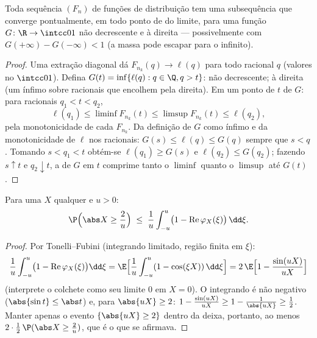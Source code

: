 \begin{theorem}
\label{thm:b3:clt:helly}
Toda sequência $(F_n)$ de funções de distribuição tem uma
subsequência que converge pontualmente, em todo ponto de  do
limite, para uma função $G \colon
\R \to \intcc01$ não decrescente e  à direita ---
possivelmente com $G(+\infty) - G(-\infty) <
1$ (a massa pode escapar para o infinito).
\end{theorem}

\begin{proof}
Uma extração diagonal dá $F_{n_k}(q) \to \ell(q)$ para todo racional $q$ (valores no
 $\intcc01$). Defina $G(t) = \inf\{\ell(q) : q \in \Q, q > t\}$: não decrescente;  à direita (um
ínfimo sobre  racionais que encolhem pela direita). Em um
ponto de  $t$ de $G$: para racionais $q_1 < t < q_2$,
\[
\ell(q_1) \leq \liminf F_{n_k}(t) \leq \limsup F_{n_k}(t)
\leq \ell(q_2),
\]
pela monotonicidade de cada $F_{n_k}$. Da definição de $G$ como ínfimo e
da monotonicidade de $\ell$ nos racionais: $G(s) \leq \ell(q) \leq G(q)$ sempre que $s < q$.
Tomando $s < q_1 < t$ obtém-se $\ell(q_1) \geq G(s)$ e $\ell(q_2) \leq G(q_2)$; fazendo $s \uparrow t$ e $q_2
\downarrow t$, a 
de $G$ em $t$ comprime tanto o $\liminf$ quanto o $\limsup$ até $G(t)$.
\end{proof}

\begin{lemma}
\label{lem:b3:clt:tightness}
Para uma  $X$ qualquer e $u > 0$:
\[
\P\Bigl(\abs X \geq \frac2u\Bigr) \;\leq\;
\frac1u\int_{-u}^{u}\bigl(1 -
\operatorname{Re}\varphi_X(\xi)\bigr)\,\dd\xi .
\]
\end{lemma}

\begin{proof}
Por Tonelli--Fubini (integrando limitado, região finita em $\xi$):
\[
\frac1u\int_{-u}^u\bigl(1 -
\operatorname{Re}\varphi_X(\xi)\bigr)\dd\xi
= \E\Bigl[\frac1u\int_{-u}^u(1 - \cos(\xi X))\,\dd\xi\Bigr]
= 2\,\E\Bigl[1 - \frac{\sin(uX)}{uX}\Bigr]
\]
(interprete o colchete como seu limite $0$ em $X = 0$). O
integrando é não negativo ($\abs{\sin t} \leq \abs t$) e, para $\abs{uX} \geq 2$: $1 - \frac{\sin(uX)}{uX} \geq 1 -
\frac1{\abs{uX}} \geq \frac12$. Manter apenas o
evento $\{\abs{uX} \geq 2\}$ dentro da  deixa, portanto, ao menos $2 \cdot \frac12\,\P(\abs X \geq \frac2u)$, que é
o que se afirmava.
\end{proof}

